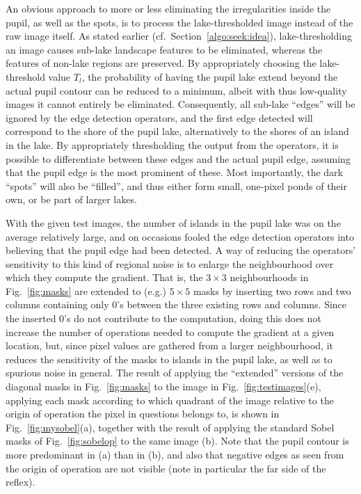 An obvious approach to more or less eliminating the irregularities
inside the pupil, as well as the spots, is to process the
lake-thresholded image instead of the raw image itself.  As stated
earlier (cf.\ Section~\ref{algo:seek:idea}), lake-thresholding an
image causes sub-lake landscape features to be eliminated, whereas the
features of non-lake regions are preserved.  By appropriately choosing
the lake-threshold value $T_{l}$, the probability of having the pupil
lake extend beyond the actual pupil contour can be reduced to a
minimum, albeit with thus low-quality images it cannot entirely be
eliminated.  Consequently, all sub-lake ``edges'' will be ignored by
the edge detection operators, and the first edge detected will
correspond to the shore of the pupil lake, alternatively to the shores
of an island in the lake.  By appropriately thresholding the output
from the operators, it is possible to differentiate between these
edges and the actual pupil edge, assuming that the pupil edge is the
most prominent of these.  Most importantly, the dark ``spots'' will
also be ``filled'', and thus either form small, one-pixel ponds of
their own, or be part of larger lakes.

With the given test images, the number of islands in the pupil lake 
was on the average relatively large, and on occasions fooled the edge
detection operators into believing that the pupil edge had been
detected.  A way of reducing the operators' sensitivity to this kind
of regional noise is to enlarge the neighbourhood over which they
compute the gradient.  That is, the $3\times 3$ neighbourhoods in
Fig.~\ref{fig:masks} are extended to (e.g.) $5\times 5$ masks by
inserting two rows and two columns containing only 0's between the
three existing rows and columns.  Since the inserted 0's do not
contribute to the computation, doing this does not increase the number
of operations needed to compute the gradient at a given location, but,
since pixel values are gathered from a larger neighbourhood, it
reduces the sensitivity of the masks to islands in the pupil lake, as
well as to spurious noise in general.  The result of applying the
``extended'' versions of the diagonal masks in Fig.~\ref{fig:masks} to
the image in Fig.~\ref{fig:testimages}(e), applying each mask
according to which quadrant of the image relative to the origin of
operation the pixel in questions belongs to, is shown in
Fig.~\ref{fig:mysobel}(a), together with the result of applying the
standard Sobel masks of Fig.~\ref{fig:sobelop} to the same image (b).
Note that the pupil contour is more predominant in (a) than in (b),
and also that negative edges as seen from the origin of operation are
not visible (note in particular the far side of the reflex).

